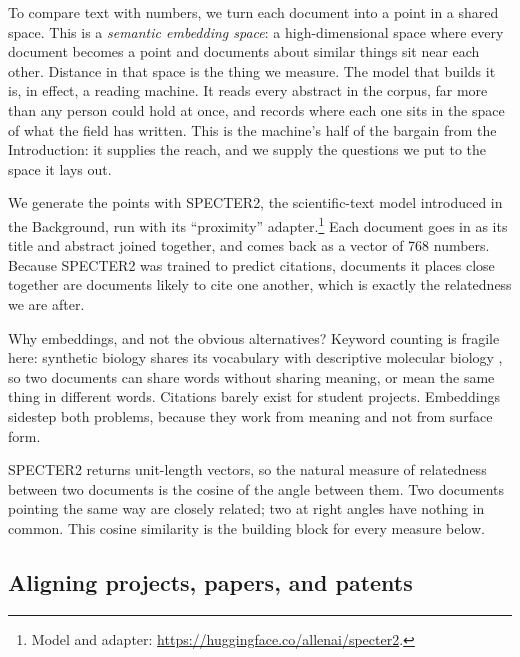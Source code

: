 \documentclass[12pt,a4paper]{article}
\begin{document}
	To compare text with numbers, we turn each document into a point in a shared space.
	This is a \textit{semantic embedding space}: a high-dimensional space where every
	document becomes a point and documents about similar things sit near each other.
	Distance in that space is the thing we measure. The model that builds it is, in
	effect, a reading machine. It reads every abstract in the corpus, far more than any
	person could hold at once, and records where each one sits in the space of what the
	field has written. This is the machine's half of the bargain from the Introduction:
	it supplies the reach, and we supply the questions we put to the space it lays out.
	
	We generate the points with SPECTER2, the scientific-text model introduced in the
	Background, run with its ``proximity'' adapter.\footnote{Model and adapter:
		\url{https://huggingface.co/allenai/specter2}.} Each document goes in as its title
	and abstract joined together, and comes back as a vector of 768 numbers. Because
	SPECTER2 was trained to predict citations, documents it places close together are
	documents likely to cite one another, which is exactly the relatedness we are
	after.
	
	Why embeddings, and not the obvious alternatives? Keyword counting is fragile
	here: synthetic biology shares its vocabulary with descriptive molecular biology
	\citep{oldhamSyntheticBiologyMapping2018}, so two documents can share words without
	sharing meaning, or mean the same thing in different words. Citations barely exist
	for student projects. Embeddings sidestep both problems, because they work from
	meaning and not from surface form.
	
	SPECTER2 returns unit-length vectors, so the natural measure of relatedness between
	two documents is the cosine of the angle between them. Two documents pointing the
	same way are closely related; two at right angles have nothing in common. This
	cosine similarity is the building block for every measure below.
	
	\subsection{Aligning projects, papers, and patents}
	
\end{document}
